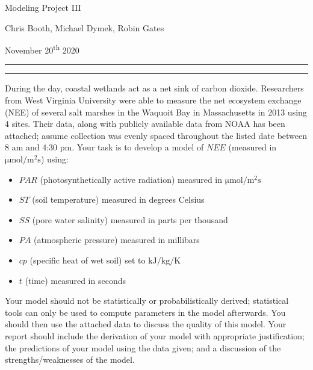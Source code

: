 \documentclass{article}
\begin{document}
\begin{spacing}{1.2}
    \begin{center}
        {\Large{Modeling Project III}}
    
        Chris Booth, Michael Dymek, Robin Gates
    
        November 20\textsuperscript{th} 2020
    \end{center}
\end{spacing}

\hrule
\vspace{5pt}
\hrule
\vspace{15pt}

\vspace{10pt}

During the day, coastal wetlands act as a net sink of carbon dioxide.  Researchers from West Virginia University were able to measure the net ecosystem exchange (NEE) of several salt marshes in the Waquoit Bay in Massachusetts in 2013 using 4 sites. Their data, along with publicly available data from NOAA has been attached; assume collection was evenly spaced throughout the listed date between 8 am and 4:30 pm. Your task is to develop a model of $NEE$ (measured in $\si{\micro \mole \per \meter^2 \second}$) using:
\begin{itemize}
    \item $PAR$ (photosynthetically active radiation) measured in $\si{\micro \mole \per \meter^2 \second}$
    \item $ST$ (soil temperature) measured in degrees Celsius
    \item $SS$ (pore water salinity) measured in parts per thousand
    \item $PA$ (atmospheric pressure) measured in millibars
    \item $cp$ (specific heat of wet soil) set to $\si{\kilo \joule \per \kilo \gram \per \kelvin}$
    \item $t$ (time) measured in seconds
\end{itemize}

Your model should not be statistically or probabilistically derived; statistical tools can only be used to compute parameters in the model afterwards. You should then use the attached data to discuss the quality of this model. Your report should include the derivation of your model with appropriate justification; the predictions of your model using the data given; and a discussion of the strengths/weaknesses of the model.
\end{document}
